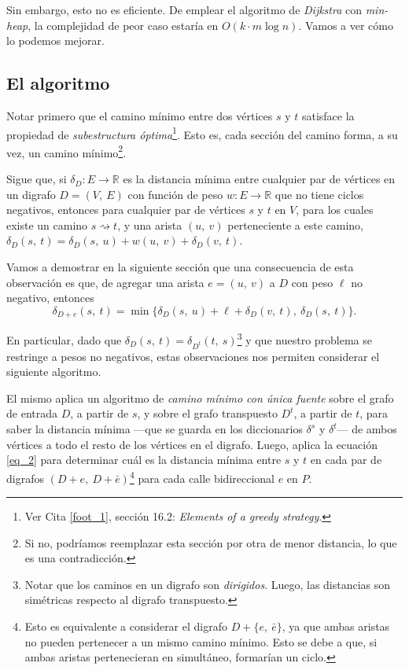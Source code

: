 Sin embargo, esto no es eficiente. De emplear el algoritmo de \textit{Dijkstra} con \textit{min-heap}, la complejidad de peor caso estaría en $O(k\cdot m\log n)$. Vamos a ver cómo lo podemos mejorar. 

\subsection{El algoritmo}

Notar primero que el camino mínimo entre dos vértices $s$ y $t$ satisface la propiedad de \textit{subestructura óptima}\footnote{Ver Cita \ref{foot_1}, sección 16.2: \textit{Elements of a greedy strategy}.}. Esto es, cada sección del camino forma, a su vez, un camino mínimo\footnote{Si no, podríamos reemplazar esta sección por otra de menor distancia, lo que es una contradicción.}. 

Sigue que, si $\delta_D : E \to \mathbb{R}$ es la distancia mínima entre cualquier par de vértices en un digrafo $D = (V,\ E)$ con función de peso $w: E \to \mathbb{R}$ que no tiene ciclos negativos, entonces para cualquier par de vértices $s$ y $t$ en $V$, para los cuales existe un camino $s \rightsquigarrow t$, y una arista $(u,\ v)$ perteneciente a este camino, $\delta_D(s,\ t) = \delta_D(s,\ u) + w(u,\ v) + \delta_D(v,\ t)$.

Vamos a demostrar en la siguiente sección que una consecuencia de esta observación es que, de agregar una arista $e = (u,\ v)$ a $D$ con peso $\ell$ no negativo, entonces 
\begin{equation}\label{eq_2}
    \delta_{D + e}(s,\ t) = \min\{\delta_{D}(s,\ u) + \ell + \delta_{D}(v,\ t),\ \delta_{D}(s,\ t)\}.
\end{equation}

En particular, dado que $\delta_D(s,\ t) = \delta_{D^t}(t,\ s)$\footnote{ Notar que los caminos en un digrafo son \textit{dirigidos}. Luego, las distancias son simétricas respecto al digrafo transpuesto.} y que nuestro problema se restringe a pesos no negativos, estas observaciones nos permiten considerar el siguiente algoritmo.



El mismo aplica un algoritmo de \textit{camino mínimo con única fuente} sobre el grafo de entrada $D$, a partir de $s$, y sobre el grafo transpuesto $D^t$, a partir de $t$, para saber la distancia mínima ---que se guarda en los diccionarios $\delta^s$ y $\delta^t$--- de ambos vértices a todo el resto de los vértices en el digrafo. Luego, aplica la ecuación \ref{eq_2} para determinar cuál es la distancia mínima entre $s$ y $t$ en cada par de digrafos $(D + e,\ D + \bar{e})$\footnote{Esto es equivalente a considerar el digrafo $D + \{e,\ \bar{e}\}$, ya que ambas aristas no pueden pertenecer a un mismo camino mínimo. Esto se debe a que, si ambas aristas pertenecieran en simultáneo, formarían un ciclo.} para cada calle bidireccional $e$ en $P$.

